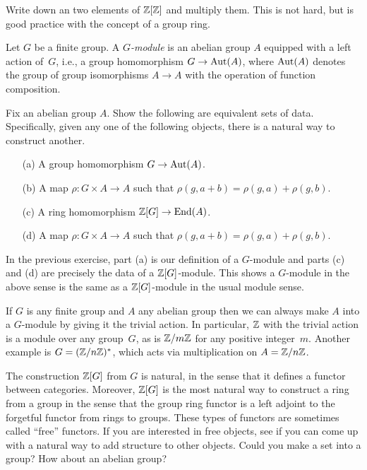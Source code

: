\begin{exercise}
	Write down an two elements of $\mathbb{Z}[\mathbb{Z}]$ and multiply them.
	This is not hard, but is good practice with the concept
	of a group ring.
\end{exercise}

\begin{definition}
	Let $G$ be a finite group. A \emph{$G$-module} is
	an abelian group $A$ equipped with a left action of~$G$,
	i.e., a group homomorphism $G\to\operatorname{Aut}(A)$, where $\operatorname{Aut}(A)$
	denotes the group of group isomorphisms $A\to A$ with
	the operation of function composition.
\end{definition}

\begin{exercise}\label{ex:equivalentdata}
	Fix an abelian group $A$.
	Show the following are equivalent sets of data.
	Specifically, given any one of the following objects,
	there is a natural way to construct another.
	\begin{enumerate}
		\item[(a)] A group homomorphism $G\to \operatorname{Aut}(A)$.
		\item[(b)] A map $\rho:G\times A \to A$ such that
			$\rho(g,a+b) = \rho(g,a) + \rho(g,b)$.
		\item[(c)] A ring homomorphism $\mathbb{Z}[G] \to \operatorname{End}(A)$.
		\item[(d)] A map $\rho:G\times A \to A$ such that
					$\rho(g,a+b) = \rho(g,a) + \rho(g,b)$.
	\end{enumerate}
\end{exercise}

\begin{remark}
	In the previous exercise, part (a) is our definition
	of a $G$-module and parts (c) and (d) are precisely
	the data of a $\mathbb{Z}[G]$-module. This shows a $G$-module
	in the above sense is the same as a $\mathbb{Z}[G]$-module
	in the usual module sense.
\end{remark}

\begin{example}
	If $G$ is any finite group and $A$ any abelian group
	then we can always make $A$ into a $G$-module by
	giving it the trivial action.
	In particular, $\mathbb{Z}$ with the trivial action is a
	module over any group~$G$, as is $\mathbb{Z}/m\mathbb{Z}$ for any positive
	integer~$m$. Another example is $G=(\mathbb{Z}/n\mathbb{Z})^*$, which acts
	via multiplication on $A = \mathbb{Z}/n\mathbb{Z}$.
\end{example}

\begin{remark}
	The construction $\mathbb{Z}[G]$ from $G$ is natural, in the
	sense that it defines a functor between categories.
	Moreover, $\mathbb{Z}[G]$ is the most natural way to construct
	a ring from a group in the sense that the group ring
	functor is a left adjoint to the forgetful functor from
	rings to groups. These types of functors are sometimes
	called ``free'' functors. If you are interested in
	free objects, see if you can come up with a natural way
	to add structure to other objects. Could you make a set
	into a group? How about an abelian group?
\end{remark}

